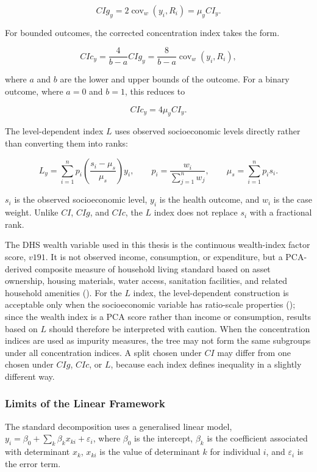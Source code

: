 \documentclass[
  11pt,
  a4paper,
]{article}
\begin{document}
\[
CIg_y = 2\operatorname{cov}_w(y_i, R_i) = \mu_y CI_y.
\]

For bounded outcomes, the corrected concentration index takes the form.

\[
CIc_y = \frac{4}{b-a}CIg_y
= \frac{8}{b-a}\operatorname{cov}_w(y_i, R_i),
\]

where \(a\) and \(b\) are the lower and upper bounds of the outcome. For
a binary outcome, where \(a=0\) and \(b=1\), this reduces to

\[
CIc_y = 4\mu_y CI_y.
\]

The level-dependent index \(L\) uses observed socioeconomic levels
directly rather than converting them into ranks:

\[
L_y =
\sum_{i=1}^{n} p_i
\left(\frac{s_i-\mu_s}{\mu_s}\right)y_i,
\qquad
p_i = \frac{w_i}{\sum_{j=1}^{n} w_j},
\qquad
\mu_s = \sum_{i=1}^{n} p_i s_i.
\]

\(s_i\) is the observed socioeconomic level, \(y_i\) is the health
outcome, and \(w_i\) is the case weight. Unlike \(CI\), \(CIg\), and
\(CIc\), the \(L\) index does not replace \(s_i\) with a fractional
rank.

The DHS wealth variable used in this thesis is the continuous
wealth-index factor score, \(v191\). It is not observed income,
consumption, or expenditure, but a PCA-derived composite measure of
household living standard based on asset ownership, housing materials,
water access, sanitation facilities, and related household amenities
(). For the \(L\) index, the level-dependent construction is
acceptable only when the socioeconomic variable has ratio-scale
properties (); since the wealth index is a PCA score rather than
income or consumption, results based on \(L\) should therefore be
interpreted with caution. When the concentration indices are used as
impurity measures, the tree may not form the same subgroups under all
concentration indices. A split chosen under \(CI\) may differ from one
chosen under \(CIg\), \(CIc\), or \(L\), because each index defines
inequality in a slightly different way.

\subsubsection{Limits of the Linear
Framework}\label{sec-linear-framework-limits}

The standard decomposition uses a generalised linear model,
\(y_i = \beta_0 + \sum_k \beta_k x_{ki} + \varepsilon_i\), where
\(\beta_0\) is the intercept, \(\beta_k\) is the coefficient associated
with determinant \(x_k\), \(x_{ki}\) is the value of determinant \(k\)
for individual \(i\), and \(\varepsilon_i\) is the error term.
\end{document}
